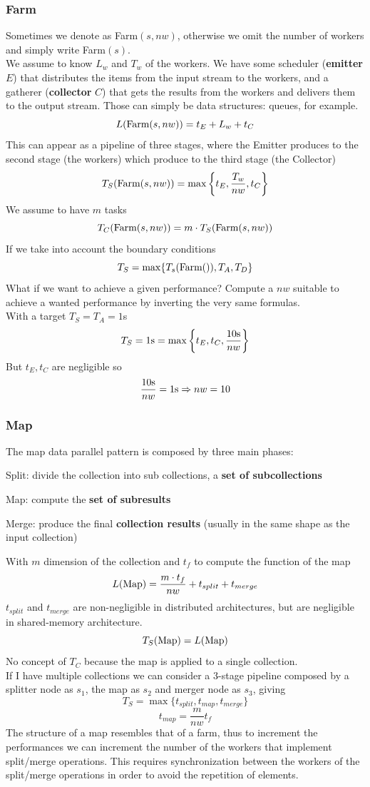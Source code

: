 \documentclass[10pt]{report}
\begin{document}
\subsubsection{Farm}
Sometimes we denote as Farm$(s, nw)$, otherwise we omit the number of workers and simply write Farm$(s)$.\\
We assume to know $L_w$ and $T_w$ of the workers. We have some scheduler (\textbf{emitter} $E$) that distributes the items from the input stream to the workers, and a gatherer (\textbf{collector} $C$) that gets the results from the workers and delivers them to the output stream. Those can simply be data structures: queues, for example.
$$L(\hbox{Farm}(s,nw)) = t_E + L_w + t_C$$
This can appear as a pipeline of three stages, where the Emitter produces to the second stage (the workers) which produce to the third stage (the Collector)
$$T_S(\hbox{Farm}(s,nw)) = \max\left\{t_E, \frac{T_w}{nw}, t_C\right\}$$
We assume to have $m$ tasks
$$T_C(\hbox{Farm}(s,nw)) = m\cdot T_S(\hbox{Farm}(s,nw))$$
If we take into account the boundary conditions
$$T_S=\max\{T_s(\hbox{Farm}()),T_A,T_D\}$$
What if we want to achieve a given performance? Compute a $nw$ suitable to achieve a wanted performance by inverting the very same formulas.\\
With a target $T_S = T_A = 1$s
$$T_S = 1\hbox{s} = \max\left\{t_E, t_C, \frac{10\hbox{s}}{nw}\right\}$$
But $t_E,t_C$ are negligible so $$\frac{10\hbox{s}}{nw} = 1\hbox{s} \Rightarrow nw = 10$$
\subsubsection{Map} The map data parallel pattern is composed by three main phases:
\begin{list}{}{}
	\item Split: divide the collection into sub collections, a \textbf{set of subcollections}
	\item Map: compute the \textbf{set of subresults}
	\item Merge: produce the final \textbf{collection results} (usually in the same shape as the input collection)
\end{list}
With $m$ dimension of the collection and $t_f$ to compute the function of the map $$L(\hbox{Map}) = \frac{m\cdot t_f}{nw} + t_{split} + t_{merge}$$
$t_{split}$ and $t_{merge}$ are non-negligible in distributed architectures, but are negligible in shared-memory architecture.
$$T_S(\hbox{Map}) = L(\hbox{Map})$$
No concept of $T_C$ because the map is applied to a single collection.\\
If I have multiple collections we can consider a 3-stage pipeline composed by a splitter node as $s_1$, the map as $s_2$ and merger node as $s_3$, giving
$$T_S=\max\{t_{split}, t_{map}, t_{merge}\}$$
$$t_{map} = \frac{m}{nw}t_f$$
The structure of a map resembles that of a farm, thus to increment the performances we can increment the number of the workers that implement split/merge operations. This requires synchronization between the workers of the split/merge operations in order to avoid the repetition of elements.
\end{document}
